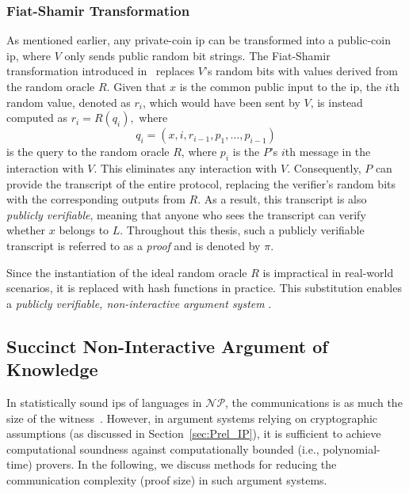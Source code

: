 \subsubsection{Fiat-Shamir Transformation}
As mentioned earlier, any private-coin \gls{ip} can be transformed into a public-coin \gls{ip}, where \( V \) only sends public random bit strings. The Fiat-Shamir transformation introduced in~\cite{Fiat1987} replaces \( V \)'s random bits with values derived from the random oracle \( R \). Given that \( x \) is the common public input to the \gls{ip}, the \( i \)th random value, denoted as \( r_i \), which would have been sent by \( V \), is instead computed as 
\(
r_i = R(q_i),
\)
where 
\[
q_i = (x, i, r_{i-1}, p_1, \dots, p_{i-1}) 
\]
is the query to the random oracle \( R \), where $p_i$ is the $P$'s $i$th message in the interaction with $V$. This eliminates any interaction with \( V \). Consequently, \( P \) can provide the transcript of the entire protocol, replacing the verifier's random bits with the corresponding outputs from \( R \). As a result, this transcript is also \textit{publicly verifiable}, meaning that anyone who sees the transcript can verify whether \( x \) belongs to \( L \). Throughout this thesis, such a publicly verifiable transcript is referred to as a \textit{proof} and is denoted by $\pi$.

Since the instantiation of the ideal random oracle \( R \) is impractical in real-world scenarios, it is replaced with hash functions in practice. This substitution enables a \textit{publicly verifiable, non-interactive argument system} \cite{Thaler2022Proofs}.

\subsection{Succinct Non-Interactive Argument of Knowledge}

In statistically sound \gls{ip}s of languages in $\mathcal{NP}$, the communications is as much the size of the witness~\cite{Nitulescu2019Lattice}. However, in argument systems relying on cryptographic assumptions (as discussed in Section~\ref{sec:Prel_IP}), it is sufficient to achieve computational soundness against computationally bounded (i.e., polynomial-time) provers. In the following, we discuss methods for reducing the communication complexity (proof size) in such argument systems.

